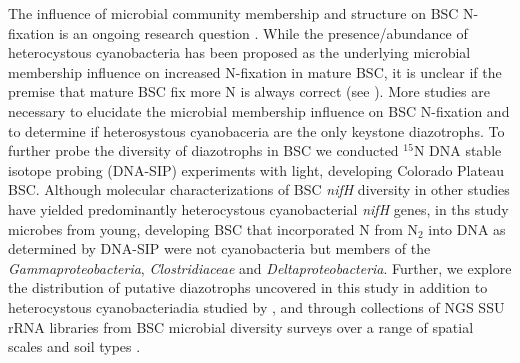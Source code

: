 The influence of microbial community membership and structure on BSC N-fixation
is an ongoing research question \cite{Belnap28062013}. While the
presence/abundance of heterocystous cyanobacteria has been proposed as the
underlying microbial membership influence on increased N-fixation in mature
BSC, it is unclear if the premise that mature BSC fix more N is always correct
(see \citet{15643930}). More studies are necessary to elucidate the microbial
membership influence on BSC N-fixation and to determine if heterosystous
cyanobaceria are the only keystone diazotrophs. To further probe the diversity
of diazotrophs in BSC we conducted $^{15}$N DNA stable isotope probing
(DNA-SIP) experiments with light, developing Colorado Plateau BSC. Although
molecular characterizations of BSC \textit{nifH} diversity in other studies
have yielded predominantly heterocystous cyanobacterial \textit{nifH} genes, in
ths study microbes from young, developing BSC that incorporated N from
N$_{2}$ into DNA as determined by DNA-SIP were not cyanobacteria but
members of the \textit{Gammaproteobacteria}, \textit{Clostridiaceae} and
\textit{Deltaproteobacteria}. Further, we explore the distribution of putative
diazotrophs uncovered in this study in addition to heterocystous
cyanobacteriadia studied by \citet{14766579}, \citet{Yeager} and
\citet{Yeager_2012} through collections of NGS SSU rRNA libraries from BSC
microbial diversity surveys over a range of spatial scales and soil types
\cite{Garcia_Pichel_2013, Steven_2013}.
